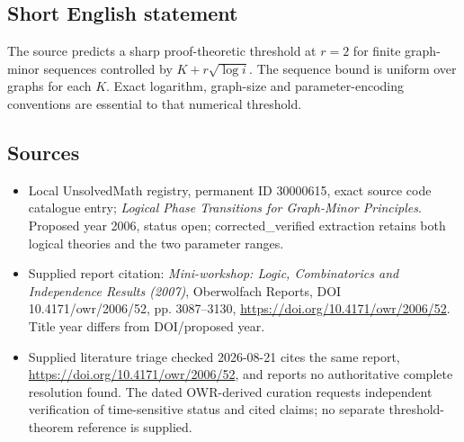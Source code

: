 \documentclass[11pt]{article}
\begin{document}
\subsection{Short English statement}
The source predicts a sharp proof-theoretic threshold at $r=2$ for finite graph-minor sequences controlled by $K+r\sqrt{\log i}$. The sequence bound is uniform over graphs for each $K$. Exact logarithm, graph-size and parameter-encoding conventions are essential to that numerical threshold.
\subsection{Sources}
\begin{itemize}
\item Local UnsolvedMath registry, permanent ID 30000615, exact source code catalogue entry; \emph{Logical Phase Transitions for Graph-Minor Principles}. Proposed year 2006, status open; corrected\_verified extraction retains both logical theories and the two parameter ranges.
\item Supplied report citation: \emph{Mini-workshop: Logic, Combinatorics and Independence Results (2007)}, Oberwolfach Reports, DOI 10.4171/owr/2006/52, pp. 3087--3130, \url{https://doi.org/10.4171/owr/2006/52}. Title year differs from DOI/proposed year.
\item Supplied literature triage checked 2026-08-21 cites the same report, \url{https://doi.org/10.4171/owr/2006/52}, and reports no authoritative complete resolution found. The dated OWR-derived curation requests independent verification of time-sensitive status and cited claims; no separate threshold-theorem reference is supplied.
\end{itemize}
\end{document}
